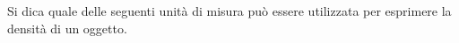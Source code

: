 Si dica quale delle seguenti unità di misura può essere 
utilizzata per esprimere la densità di un oggetto.